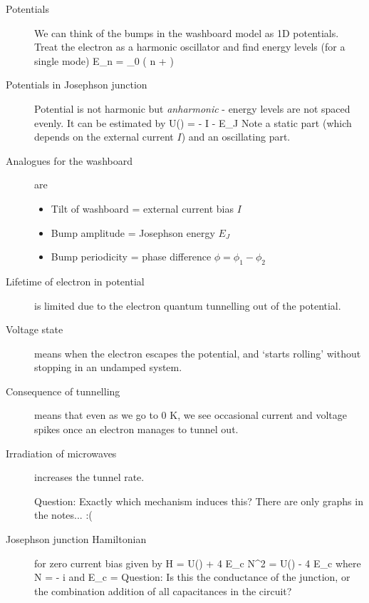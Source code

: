 \begin{description}
\item[Potentials] We can think of the bumps in the washboard model as 1D potentials. Treat the electron as a harmonic oscillator and find energy levels (for a single mode)
\beq
E_n = \hbar \omega_0 \left(  n +  \right)
\eeq

\item[Potentials in Josephson junction] Potential is not harmonic but \emph{anharmonic} - energy levels are not spaced evenly. It can be estimated by 
\beq
U(\phi) = -  I \phi - E_J \cos{\phi}
\eeq
Note a static part (which depends on the external current $I$) and an oscillating part. 

\item[Analogues for the washboard] are
\begin{itemize}
\item Tilt of washboard = external current bias $I$
\item Bump amplitude = Josephson energy $E_J$
\item Bump periodicity = phase difference $\phi = \phi_1 - \phi_2$
\end{itemize}

\item[Lifetime of electron in potential] is limited due to the electron quantum tunnelling out of the potential. 

\item[Voltage state] means when the electron escapes the potential, and `starts rolling' without stopping in an undamped system. 

\item[Consequence of tunnelling] means that even as we go to 0 K, we see occasional current and voltage spikes once an electron manages to tunnel out. 

\item[Irradiation of microwaves] increases the tunnel rate. 

Question: Exactly which mechanism induces this? There are only graphs in the notes... :(

\item[Josephson junction Hamiltonian ] for zero current bias given by 
\beq
H = U(\phi) + 4 E_c N^2 = U(\phi) - 4 E_c 
\eeq
where
\beq
N = - i \frac{\p}{\p \phi}
\eeq
and
\beq
E_c = 
\eeq
Question: Is this the conductance of the junction, or the combination addition of all capacitances in the circuit? 


\end{description}
